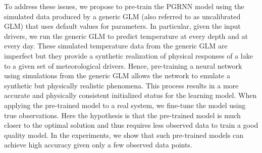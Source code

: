 \documentclass[book.tex]{subfiles}
\begin{document}
To address these issues, we propose to pre-train the PGRNN model using
the simulated data produced by a generic GLM (also referred to as
uncalibrated GLM) that uses default values for parameters. In
particular, given the input drivers, we run the generic GLM to predict
temperature at every depth and at every day. These simulated temperature
data from the generic GLM are imperfect but they provide a synthetic
realization of physical responses of a lake to a given set of
meteorological drivers. Hence, pre-training a neural network using
simulations from the generic GLM allows the network to emulate a
synthetic but physically realistic phenomena. This process results in a
more accurate and physically consistent initialized status for the
learning model. When applying the pre-trained model to a real system, we
fine-tune the model using true observations. Here the hypothesis is
that the pre-trained model is much closer to the optimal solution and
thus requires less observed data to train a good quality model. In the
experiments, we show that such pre-trained models can achieve high
accuracy given only a few observed data points.
\end{document}
